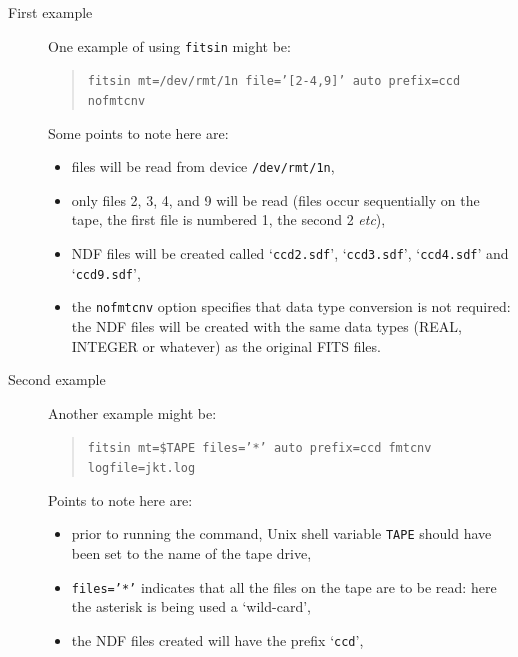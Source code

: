\documentclass[twoside,11pt]{article}
\begin{document}
\begin{description}

  \item[First example] One example of using {\tt fitsin} might be:

  \begin{quote}
   {\tt fitsin mt=/dev/rmt/1n file='[2-4,9]' auto prefix=ccd nofmtcnv}
  \end{quote}

   Some points to note here are:

  \begin{itemize}

    \item files will be read from device {\tt /dev/rmt/1n},

    \item only files 2, 3, 4, and 9 will be read (files occur sequentially
     on the tape, the first file is numbered 1, the second 2 \emph{etc}),

    \item NDF files will be created called `{\tt ccd2.sdf}',
     `{\tt ccd3.sdf}', `{\tt ccd4.sdf}' and `{\tt ccd9.sdf}',

    \item the {\tt nofmtcnv} option specifies that data type conversion
     is not required: the NDF files will be created with the same data
     types (REAL, INTEGER or whatever) as the original FITS files.

  \end{itemize}

  \item[Second example] Another example might be:

  \begin{quote}
   {\tt fitsin mt=\$TAPE files='*' auto prefix=ccd fmtcnv logfile=jkt.log}
  \end{quote}

   Points to note here are:

  \begin{itemize}

    \item prior to running the command, Unix shell variable {\tt TAPE}
     should have been set to the name of the tape drive,

    \item {\tt files='*'} indicates that all the files on the tape are
     to be read: here the asterisk is being used a `wild-card',

    \item the NDF files created will have the prefix `{\tt ccd}',


\end{itemize}
\end{description}
\end{document}
